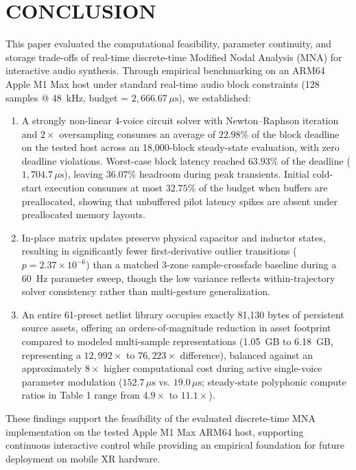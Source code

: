 \documentclass[fleqn,final]{jaes}
\begin{document}
\section{CONCLUSION}

This paper evaluated the computational feasibility, parameter continuity, and storage trade-offs of real-time discrete-time Modified Nodal Analysis (MNA) for interactive audio synthesis. Through empirical benchmarking on an ARM64 Apple M1 Max host under standard real-time audio block constraints (128 samples @ 48~kHz, budget = $2,666.67\,\mu\text{s}$), we established:
\begin{enumerate}
\item A strongly non-linear 4-voice circuit solver with Newton--Raphson iteration and $2\times$ oversampling consumes an average of $22.98\%$ of the block deadline on the tested host across an 18,000-block steady-state evaluation, with zero deadline violations. Worst-case block latency reached $63.93\%$ of the deadline ($1,704.7\,\mu\text{s}$), leaving $36.07\%$ headroom during peak transients. Initial cold-start execution consumes at most $32.75\%$ of the budget when buffers are preallocated, showing that unbuffered pilot latency spikes are absent under preallocated memory layouts.
\item In-place matrix updates preserve physical capacitor and inductor states, resulting in significantly fewer first-derivative outlier transitions ($p = 2.37 \times 10^{-6}$) than a matched 3-zone sample-crossfade baseline during a 60~Hz parameter sweep, though the low variance reflects within-trajectory solver consistency rather than multi-gesture generalization.
\item An entire 61-preset netlist library occupies exactly 81,130 bytes of persistent source assets, offering an orders-of-magnitude reduction in asset footprint compared to modeled multi-sample representations (1.05~GB to 6.18~GB, representing a $12,992\times$ to $76,223\times$ difference), balanced against an approximately $8\times$ higher computational cost during active single-voice parameter modulation ($152.7\,\mu\text{s}$ vs. $19.0\,\mu\text{s}$; steady-state polyphonic compute ratios in Table 1 range from $4.9\times$ to $11.1\times$).
\end{enumerate}

These findings support the feasibility of the evaluated discrete-time MNA implementation on the tested Apple M1 Max ARM64 host, supporting continuous interactive control while providing an empirical foundation for future deployment on mobile XR hardware.
\end{document}
